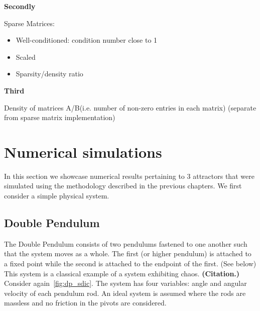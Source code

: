 \documentclass[a4paper,12pt,twoside]{report}
\begin{document}
\textbf{Secondly}

Sparse Matrices:
\vspace{-8mm}
\begin{itemize}[noitemsep]
\item Well-conditioned: condition number close to 1
\item Scaled
\item Sparsity/density ratio
\end{itemize}



\textbf{Third}

Density of matrices A/B(i.e. number of non-zero entries in each matrix) (separate from sparse matrix implementation)

\section{Numerical simulations}
In this section we showcase numerical results pertaining to 3 attractors that were simulated using the methodology described in the previous chapters. We first consider a simple physical system.
\subsection{Double Pendulum}

The Double Pendulum consists of two pendulums fastened to one another such that the system moves as a whole. The first (or higher pendulum) is attached to a fixed point while the second is attached to the endpoint of the first. (See below)
This system is a classical example of a system exhibiting chaos. \textbf{(Citation.)} Consider again~\ref{fig:dp_sdic}.
The system has four variables: angle and angular velocity of each pendulum rod. An ideal system is assumed where the rods are massless and no friction in the pivots are considered.
\end{document}
